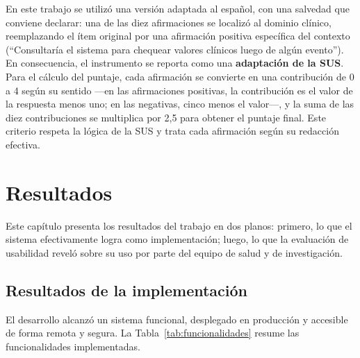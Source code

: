 \documentclass[12pt,a4paper]{article}
\begin{document}
    En este trabajo se utilizó una versión adaptada al español, con una salvedad que conviene declarar: una de las diez afirmaciones se localizó al dominio clínico, reemplazando el ítem original por una afirmación positiva específica del contexto (``Consultaría el sistema para chequear valores clínicos luego de algún evento''). En consecuencia, el instrumento se reporta como una \textbf{adaptación de la SUS}. Para el cálculo del puntaje, cada afirmación se convierte en una contribución de 0 a 4 según su sentido —en las afirmaciones positivas, la contribución es el valor de la respuesta menos uno; en las negativas, cinco menos el valor—, y la suma de las diez contribuciones se multiplica por 2,5 para obtener el puntaje final. Este criterio respeta la lógica de la SUS y trata cada afirmación según su redacción efectiva.
\newpage

\section{Resultados}

    Este capítulo presenta los resultados del trabajo en dos planos: primero, lo que el sistema efectivamente logra como implementación; luego, lo que la evaluación de usabilidad reveló sobre su uso por parte del equipo de salud y de investigación.

    \subsection{Resultados de la implementación}
    El desarrollo alcanzó un sistema funcional, desplegado en producción y accesible de forma remota y segura. La Tabla~\ref{tab:funcionalidades} resume las funcionalidades implementadas.
\end{document}
